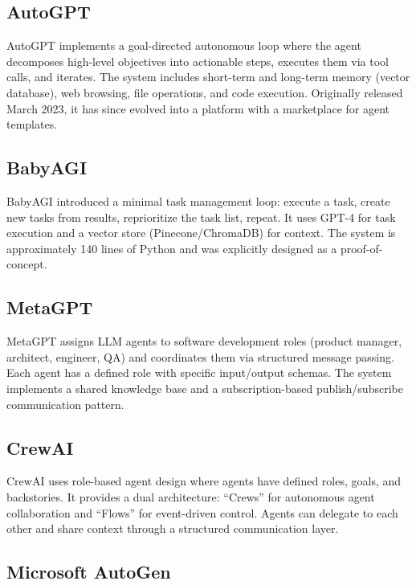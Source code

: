 \documentclass[12pt,a4paper]{article}
\begin{document}
\subsection{AutoGPT}

AutoGPT \citep{richards2023autogpt} implements a goal-directed autonomous loop where the agent decomposes high-level objectives into actionable steps, executes them via tool calls, and iterates. The system includes short-term and long-term memory (vector database), web browsing, file operations, and code execution. Originally released March 2023, it has since evolved into a platform with a marketplace for agent templates.

\subsection{BabyAGI}

BabyAGI \citep{nakajima2023babyagi} introduced a minimal task management loop: execute a task, create new tasks from results, reprioritize the task list, repeat. It uses GPT-4 for task execution and a vector store (Pinecone/ChromaDB) for context. The system is approximately 140 lines of Python and was explicitly designed as a proof-of-concept.

\subsection{MetaGPT}

MetaGPT \citep{hong2023metagpt} assigns LLM agents to software development roles (product manager, architect, engineer, QA) and coordinates them via structured message passing. Each agent has a defined role with specific input/output schemas. The system implements a shared knowledge base and a subscription-based publish/subscribe communication pattern.

\subsection{CrewAI}

CrewAI \citep{moura2024crewai} uses role-based agent design where agents have defined roles, goals, and backstories. It provides a dual architecture: ``Crews'' for autonomous agent collaboration and ``Flows'' for event-driven control. Agents can delegate to each other and share context through a structured communication layer.

\subsection{Microsoft AutoGen}
\end{document}
